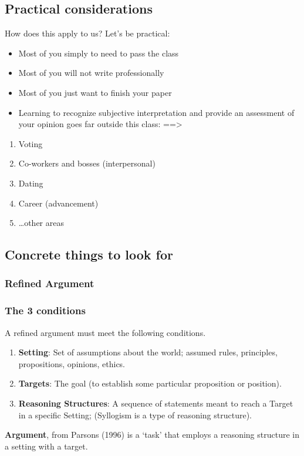 \documentclass{beamer}
\begin{document}
\subsection{Practical considerations}
\begin{frame}{How does this apply to us?}
Let's be practical:\pause
\begin{itemize}[<+-| alert@+>]
\item Most of you simply to need to pass the class
\item Most of you will not write professionally
\item Most of you just want to finish your paper
\item Learning to recognize subjective interpretation and provide an assessment of your opinion goes far outside this class:  ==>
\end{itemize}
\begin{enumerate}
\item<+-> Voting
\item<+-> Co-workers and bosses (interpersonal)
\item<+-> Dating
\item<+-> Career (advancement)
\item<+-> \ldots other areas
\end{enumerate}
\end{frame}\label{Application}


\subsection{Concrete things to look for}
\subsubsection{Refined Argument}
\begin{frame}\frametitle{The 3 conditions}
A refined argument must meet the following conditions.\pause
\begin{enumerate}[<+-| alert@+>]
\item \textbf{Setting}: Set of assumptions about the world; assumed rules, principles, propositions, opinions, ethics.
\item \textbf{Targets}: The goal (to establish some particular proposition or position). 
\item \textbf{Reasoning Structures}: A sequence of statements meant to reach a Target in a specific Setting; (Syllogism is a type of reasoning structure). 
\end{enumerate}
\begin{exampleblock}{\textbf{Argument}, from Parsons (1996)}
 is a `task' that employs a reasoning structure in a setting with a target.
\end{exampleblock}
\end{frame}
\end{document}
